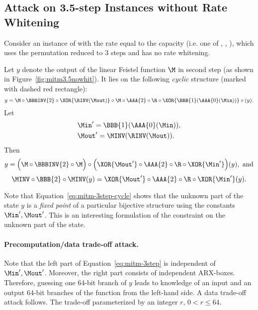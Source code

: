 \subsection{Attack on 3.5-step \aead{} Instances without Rate Whitening}

Consider an instance of \aead{} with the rate equal to the capacity (i.e. one of 
,
,
),
which uses the \aCipher{} permutation reduced to 3 steps and has no rate whitening.

Let $y$ denote the output of the linear Feistel function $\M$ in second step (as shown in Figure~\ref{fig:mitm3.5nowhit}). It lies on the following \emph{cyclic} structure (marked with dashed red rectangle):
{}
$$
y = \M \circ
    \BBBINV{2} \circ
    \XOR{\RINV(\Mout)} \circ
    \M \circ 
    \AAA{2} \circ
    \R \circ
    \XOR{\BBB{1} (\AAA{0} (\Min))} \circ
    (y).
$$
Let 
\begin{align*}
    &\Min' = \BBB{1} (\AAA{0} (\Min)),\\
    &\Mout' = \MINV(\RINV(\Mout)).
\end{align*}
Then
\begin{equation}
\label{eq:mitm-3step-cycle}
y = \Big(
    \M \circ
    \BBBINV{2} \circ
    \M \Big) \circ
    \Big(
    \XOR{\Mout'} \circ
    \AAA{2} \circ
    \R \circ
    \XOR{\Min'} \Big)
    (y), ~\text{and}
\end{equation}
\begin{equation}
\label{eq:mitm-3step}
\MINV \circ
\BBB{2} \circ
\MINV (y)
=
\XOR{\Mout'} \circ
\AAA{2} \circ
\R \circ
\XOR{\Min'} (y).
\end{equation}

Note that Equation~\ref{eq:mitm-3step-cycle} shows that the unknown part of the state $y$ is a \emph{fixed point} of a particular bijective structure using the constants $\Min',\Mout'$. This is an interesting formulation of the constraint on the unknown part of the state.


\paragraph{Precomputation/data trade-off attack.}
Note that the left part of Equation~\ref{eq:mitm-3step} is independent of $\Min',\Mout'$. Moreover, the right part  consists of independent ARX-boxes. Therefore, guessing one $64$-bit branch of $y$ leads to knowledge of an input and an output $64$-bit branches of the function from the left-hand side. A data trade-off attack follows. The trade-off parameterized by an integer $r$, $0 < r \le 64$.

